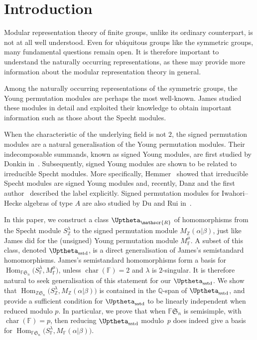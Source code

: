 \documentclass[pdftex]{sigma}
\newcommand{\Char}{\operatorname{\mathrm{char}}}
\newcommand{\Hom}{\operatorname{Hom}}
\newcommand{\sym}[1]{\mathfrak{S}_{#1}}
\newcommand{\F}{\mathbb{F}}
\newcommand{\R}{\mathscr{R}}
\newcommand{\Z}{\mathbb{Z}}
\newcommand{\Q}{\mathbb{Q}}
\newcommand{\JHOM}{\Uptheta}
\newcommand{\hJHOM}{{\JHOM}}
\begin{document}


\renewcommand{\thefootnote}{\arabic{footnote}}
\setcounter{footnote}{0}

\section{Introduction}

Modular representation theory of finite groups, unlike its ordinary counterpart, is not at all well understood. Even for ubiquitous groups like the symmetric groups, many fundamental questions remain open. It is therefore important to understand the naturally occurring representations, as these may provide more information about the modular representation theory in general.

Among the naturally occurring representations of the symmetric groups, the Young permutation modules are perhaps the most well-known. James \cite{GJ} studied these modules in detail and exploited their knowledge to obtain important information such as those about the Specht modules.

When the characteristic of the underlying field is not $2$, the signed permutation modules are a natural generalisation of the Young permutation modules. Their indecomposable summands, known as signed Young modules, are first studied by Donkin in~\cite{D}. Subsequently, signed Young modules are shown to be related to irreducible Specht modules. More specifically, Hemmer~\cite{H} showed that irreducible Specht modules are signed Young modules and, recently, Danz and the first author~\cite{DL} described the label explicitly. Signed permutation modules for Iwahori--Hecke algebras of type $A$ are also studied by Du and Rui in~\cite{DR}.

In this paper, we construct a class $\hJHOM_{\R}$ of homomorphisms from the Specht module $S_\Z^{\lambda}$ to the signed permutation module $M_\Z(\alpha|\beta)$, just like James did for the (unsigned) Young permutation module $M^{\mu}_\F$. A subset of this class, denoted $\hJHOM_{\mathrm{sstd}}$, is a direct generalisation of James's semistandard homomorphisms. James's semistandard homomorphisms form a basis for $\Hom_{\F\sym{n}}\big(S_\F^\lambda, M_\F^\mu\big)$, unless $\Char(\F)=2$ and $\lambda$ is $2$-singular. It is therefore natural to seek generalisation of this statement for our $\hJHOM_{\mathrm{sstd}}$. We show that $\Hom_{\Z\sym{n}}\big(S_\Z^\lambda, M_\Z(\alpha|\beta)\big)$ is contained in the $\Q$-span of $\hJHOM_{\mathrm{sstd}}$, and provide a sufficient condition for $\hJHOM_{\mathrm{sstd}}$ to be linearly independent when reduced modulo $p$. In particular, we prove that when $\F\sym{n}$ is semisimple, with $\Char(\F) = p$, then reducing $\hJHOM_{\mathrm{sstd}}$ modulo~$p$ does indeed give a basis for $\Hom_{\F\sym{n}}\big(S_\F^\lambda, M_\F(\alpha|\beta)\big)$.
\end{document}
